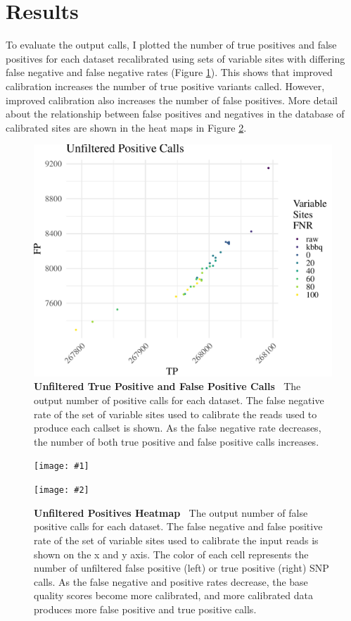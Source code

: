 \documentclass{report}
\newcommand{\titlecaption}[2]{\caption[#1]{\textbf{#1 \textbar\,} #2}}
\newcommand{\includetwo}[2]{\begin{minipage}{.475\textwidth}%
\texttt{[image: \#1]}%
\end{minipage}\hfill\begin{minipage}{.475\textwidth}%
\texttt{[image: \#2]}%
\end{minipage}}
\begin{document}
\section{Results}
\begin{outline}
\item To evaluate the output calls, I plotted the number of true positives and false positives for each dataset recalibrated using sets of variable sites with differing false negative and false negative rates (Figure \ref{fig:vc_fptp}). This shows that improved calibration increases the number of true positive variants called. However, improved calibration also increases the number of false positives. More detail about the relationship between false positives and negatives in the database of calibrated sites are shown in the heat maps in Figure \ref{fig:vc_p}.
\end{outline}


\begin{figure}
\centering
\includegraphics[width = .8\textwidth]{tp_fp_plot.pdf}
\titlecaption{Unfiltered True Positive and False Positive Calls}{The output number of positive calls for each dataset. The false negative rate of the set of variable sites used to calibrate the reads used to produce each callset is shown. As the false negative rate decreases, the number of both true positive and false positive calls increases.}
\label{fig:vc_fptp}
\end{figure}

\begin{figure}
\centering
\includetwo{fp_heatmap.pdf}{tp_heatmap.pdf}
\titlecaption{Unfiltered Positives Heatmap}{The output number of false positive calls for each dataset. The false negative and false positive rate of the set of variable sites used to calibrate the input reads is shown on the x and y axis. The color of each cell represents the number of unfiltered false positive (left) or true positive (right) SNP calls. As the false negative and positive rates decrease, the base quality scores become more calibrated, and more calibrated data produces more false positive and true positive calls.}
\label{fig:vc_p}
\end{figure}
\end{document}
